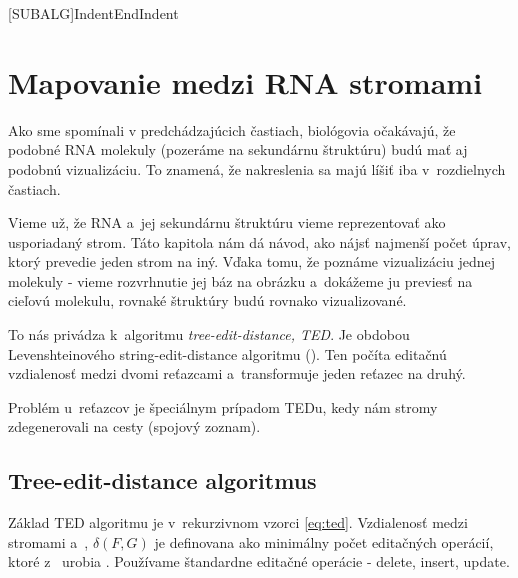 \newcommand{\Cdel}{\ensuremath{c_{del}}\xspace}
\newcommand{\Cins}{\ensuremath{c_{ins}}\xspace}
\newcommand{\Cupd}{\ensuremath{c_{upd}}\xspace}

\newcommand{\AfullDecomposition}{\ensuremath{\mathcal{A}}}
\newcommand{\FrelevantSubforests}{\ensuremath{\mathcal{F}}}
\newcommand{\pluseq}{\stackrel{+}{=}}
\newcommand{\AlgCase}{$\left\{\rule{0pt}{\baselineskip}\right.$\parbox{\textwidth}}

\newcommand{\rtedCostSum}[3]{\sum_{{#1}' \in #1 - \gamma^{#2}(#1)}cena({#1}', #3)}
\newcommand{\set}[1]{\ensuremath{\{#1\}}}


[SUBALG]{Indent}{EndIndent}{}{\algorithmicend\ }




\chapter{Mapovanie medzi RNA stromami}

Ako sme spomínali v predchádzajúcich častiach, biológovia očakávajú, že
podobné RNA molekuly (pozeráme na sekundárnu štruktúru) budú mať aj podobnú vizualizáciu.
To znamená, že nakreslenia sa majú líšiť iba v~rozdielnych častiach.

Vieme už, že RNA a~jej sekundárnu štruktúru vieme reprezentovať ako usporiadaný strom.
Táto kapitola nám dá návod, ako nájsť najmenší počet úprav, ktorý prevedie jeden strom
na iný. Vďaka tomu, že poznáme vizualizáciu jednej molekuly - vieme rozvrhnutie jej báz na
obrázku a~dokážeme ju previesť na cieľovú molekulu, rovnaké štruktúry budú rovnako vizualizované.

To nás privádza k~algoritmu \textit{tree-edit-distance, TED}. Je obdobou Levenshteinového
string-edit-distance algoritmu (\citet{LEVENSHTEIN}).
Ten počíta editačnú vzdialenosť medzi dvomi reťazcami a~transformuje
jeden reťazec na druhý.

Problém u~reťazcov je špeciálnym prípadom TEDu, kedy nám stromy zdegenerovali
na cesty (spojový zoznam).





\section{Tree-edit-distance algoritmus}

Základ TED algoritmu je v~rekurzivnom vzorci \ref{eq:ted}. Vzdialenosť medzi
stromami  a~, $\delta(F, G)$ je definovana ako minimálny počet editačných operácií,
ktoré z~ urobia . Používame štandardne editačné operácie - delete, insert, update.

